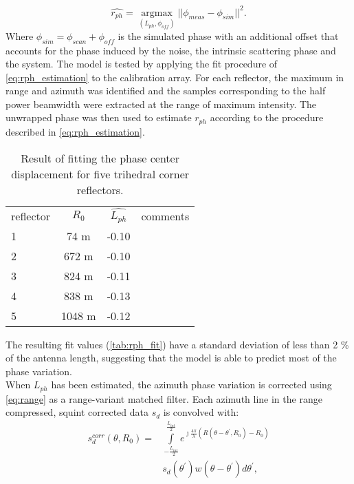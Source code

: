 \begin{equation}\label{eq:rph_estimation}
	\hat{r_{ph}} = \underset{\left(L_{ph}, \phi_{off}\right)}{\operatorname{argmax}}{\vert\vert\phi_{meas} - \phi_{sim}\vert\vert}^2.
\end{equation}
Where $\phi_{sim} = \phi_{scan} + \phi_{off}$ is the simulated phase with an additional offset that accounts for the phase induced by the noise, the intrinsic scattering phase and the system.
The model is tested by applying the fit procedure of \autoref{eq:rph_estimation} to the calibration array. For each reflector, the maximum in range and azimuth was identified and the samples corresponding to the half power beamwidth were extracted at the range of maximum intensity. The unwrapped phase was then used to estimate $r_{ph}$ according to the procedure described in \autoref{eq:rph_estimation}.
\begin{table}[ht]
	\begin{tabular}{lccl}
		\hline
		reflector & $R_0$ & $\hat{L_{ph}}$ & comments\\
		1	& 74 m & -0.10 & \\
		2  & 672 m & -0.10 & \\
		3 & 824 m & -0.11 & \\
		4 & 838 m & -0.13 &\\
		5 & 1048 m & -0.12&\\
		\hline
	\end{tabular}
	\caption{Result of fitting the phase center displacement for five trihedral corner reflectors.}
	\label{tab:rph_fit}
\end{table}
The resulting fit values (\autoref{tab:rph_fit}) have a standard deviation of less than 2 \% of the antenna length, suggesting that the model is able to predict  most of the phase variation.\\
When $L_{ph}$ has been estimated, the azimuth phase variation is corrected using \autoref{eq:range} as a range-variant matched filter. Each azimuth line in the range compressed, squint corrected data $s_{d}$ is convolved with:
\begin{equation}\label{eq:correction}
	\begin{aligned}
		s_{d}^{corr}\left(\theta, R_{0}\right) = &\int\limits_{-\frac{L_{int}}{2}}^{\frac{L_{int}}{2}}e^{\jmath \frac{4\pi}{\lambda}\left(R\left(\theta - \theta^{\prime}, R_{0}\right) - R_{0}\right)}\\
		&s_{d}\left(\theta^\prime\right)w(\theta - \theta^{\prime}) d\theta^\prime,
	\end{aligned}
\end{equation}
